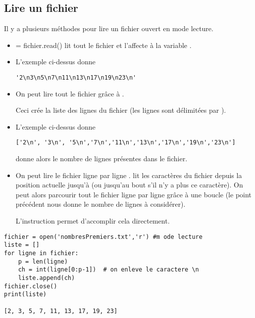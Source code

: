 \subsection{Lire un fichier }
Il y a plusieurs méthodes pour lire un fichier ouvert en mode lecture.
\begin{itemize}
\item {} = fichier.read() lit tout le fichier et l'affecte à la variable .
\item 
L'exemple ci-dessus donne
\begin{lstlisting}
'2\n3\n5\n7\n11\n13\n17\n19\n23\n'
\end{lstlisting}
\item On peut lire tout le fichier grâce à . 

Ceci crée la liste des lignes du fichier (les lignes sont délimitées par ). 

\item L'exemple ci-dessus donne
\begin{lstlisting}
['2\n', '3\n', '5\n','7\n','11\n','13\n','17\n','19\n','23\n']
\end{lstlisting}
 donne alors le nombre de lignes présentes dans le fichier.
\item On peut lire le fichier ligne par ligne .  lit les caractères du fichier depuis la position actuelle jusqu'à  (ou jusqu'au bout s'il n'y a plus ce caractère). On peut alors parcourir tout le fichier ligne par ligne  grâce à une boucle (le point précédent nous donne le nombre de lignes à considérer). 

L'instruction  permet d'accomplir cela directement.
\end{itemize}

\vspace{0.5cm}
\begin{lstlisting}[frame=lines, caption={Lecture des premiers nombres premiers}]
fichier = open('nombresPremiers.txt','r') #m ode lecture
liste = []
for ligne in fichier:
    p = len(ligne)
    ch = int(ligne[0:p-1])  # on enleve le caractere \n
    liste.append(ch)
fichier.close()
print(liste)

[2, 3, 5, 7, 11, 13, 17, 19, 23]
\end{lstlisting}
